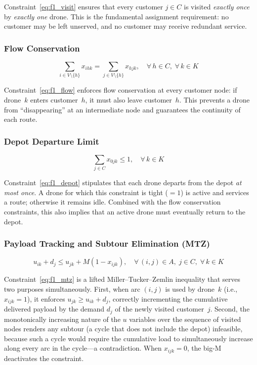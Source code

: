 \documentclass[11pt,a4paper]{article}
\begin{document}
Constraint~\eqref{eq:f1_visit} ensures that every customer $j \in C$ is visited \emph{exactly once} by \emph{exactly one} drone. This is the fundamental assignment requirement: no customer may be left unserved, and no customer may receive redundant service.

\subsubsection{Flow Conservation}
\begin{equation}
  \sum_{i \in V \setminus \{h\}} x_{ihk} = \sum_{j \in V \setminus \{h\}} x_{hjk}, \quad \forall\, h \in C,\; \forall\, k \in K
  \label{eq:f1_flow}
\end{equation}

Constraint~\eqref{eq:f1_flow} enforces flow conservation at every customer node: if drone~$k$ enters customer~$h$, it must also leave customer~$h$. This prevents a drone from ``disappearing'' at an intermediate node and guarantees the continuity of each route.

\subsubsection{Depot Departure Limit}
\begin{equation}
  \sum_{j \in C} x_{0jk} \le 1, \quad \forall\, k \in K
  \label{eq:f1_depot}
\end{equation}

Constraint~\eqref{eq:f1_depot} stipulates that each drone departs from the depot \emph{at most once}. A drone for which this constraint is tight ($= 1$) is active and services a route; otherwise it remains idle. Combined with the flow conservation constraints, this also implies that an active drone must eventually return to the depot.

\subsubsection{Payload Tracking and Subtour Elimination (MTZ)}
\begin{equation}
  u_{ik} + d_j \le u_{jk} + M(1 - x_{ijk}), \quad \forall\, (i,j) \in A,\; j \in C,\; \forall\, k \in K
  \label{eq:f1_mtz}
\end{equation}

Constraint~\eqref{eq:f1_mtz} is a lifted Miller--Tucker--Zemlin inequality that serves two purposes simultaneously. First, when arc $(i,j)$ is used by drone~$k$ (i.e., $x_{ijk} = 1$), it enforces $u_{jk} \ge u_{ik} + d_j$, correctly incrementing the cumulative delivered payload by the demand $d_j$ of the newly visited customer~$j$. Second, the monotonically increasing nature of the $u$ variables over the sequence of visited nodes renders any subtour (a cycle that does not include the depot) infeasible, because such a cycle would require the cumulative load to simultaneously increase along every arc in the cycle---a contradiction. When $x_{ijk} = 0$, the big-M deactivates the constraint.
\end{document}
